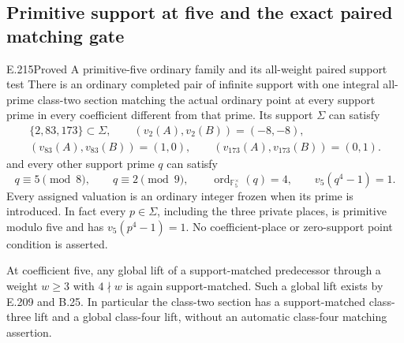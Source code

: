 
\subsection{Primitive support at five and the exact paired matching gate}

\begin{result}{E.215}{Proved}
{A primitive-five ordinary family and its all-weight paired support test}
There is an ordinary completed pair of infinite support with one integral
all-prime class-two section matching the actual ordinary point at every
support prime in every coefficient different from that prime. Its support
$\Sigma$ can satisfy
\[
 \begin{gathered}
 \{2,83,173\}\subset\Sigma,\qquad
 (v_2(A),v_2(B))=(-8,-8),\\
 (v_{83}(A),v_{83}(B))=(1,0),\qquad
 (v_{173}(A),v_{173}(B))=(0,1).
 \end{gathered}
 \tag{E.215.1}
\]
and every other support prime $q$ can satisfy
\[
 q\equiv5\pmod8,\qquad q\equiv2\pmod9,
 \qquad \operatorname{ord}_{\mathbb F_5^\times}(q)=4,
 \qquad v_5(q^4-1)=1.
 \tag{E.215.2}
\]
Every assigned valuation is an ordinary integer frozen when its prime is
introduced. In fact every $p\in\Sigma$, including the three private
places, is primitive modulo five and has $v_5(p^4-1)=1$.
No coefficient-place or zero-support point condition is asserted.

At coefficient five, any global lift of a support-matched predecessor
through a weight $w\ge3$ with $4\nmid w$ is again support-matched.
Such a global lift exists by E.209 and B.25. In particular the class-two
section has a support-matched class-three lift and a global class-four
lift, without an automatic class-four matching assertion.


\end{result}
